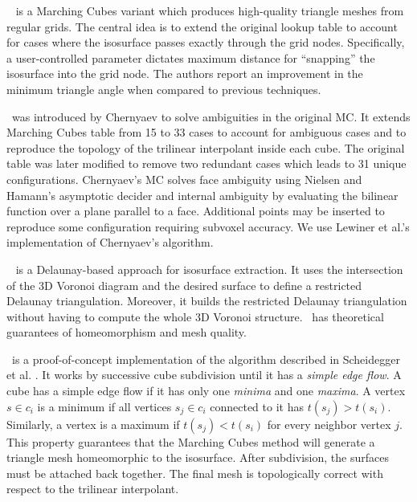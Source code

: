 \snapmc\ \cite{Raman:2008:QIM} is a Marching Cubes variant which produces high-quality 
triangle meshes from regular grids. The central idea is to extend the 
original lookup table to account for cases where the isosurface passes exactly through the 
grid nodes. Specifically, a user-controlled parameter dictates maximum distance 
for ``snapping'' the isosurface into the grid node. 
The authors report an improvement in the minimum triangle angle when compared to previous techniques.


\mclewiner\ was introduced by Chernyaev
\cite{Chernyaev95marchingcubes} to solve ambiguities in the original MC. It
extends Marching Cubes table from 15 to 33 cases to account for ambiguous cases
and to reproduce the topology of the trilinear interpolant inside each cube. The
original table was later modified to remove two redundant cases which leads to 31
unique configurations. Chernyaev's MC solves face ambiguity using Nielsen and
Hamann's \cite{Nielson:1991:ADR:949607.949621} asymptotic decider and internal ambiguity
by evaluating the bilinear function over a plane parallel to a face. Additional
points may be inserted to reproduce some configuration requiring subvoxel
accuracy.  We use Lewiner et al.'s implementation \cite{Lewiner:2003} of
Chernyaev's algorithm.

\deliso\ \cite{Dey07} is a Delaunay-based approach for isosurface extraction. 
It uses the intersection of the 3D Voronoi diagram and the desired surface to 
define a restricted Delaunay triangulation. Moreover, it
builds the restricted Delaunay triangulation without having to
compute the whole 3D Voronoi structure. \deliso\ has theoretical guarantees of
homeomorphism and mesh quality.

\mcsimpleflow\ is a proof-of-concept implementation of the algorithm
described in Scheidegger et al.
\cite{scheidegger:techreport:2010}. It works by successive cube
subdivision until it has a \emph{simple edge flow}. A cube has a
simple edge flow if it has only one \emph{minima} and one
\emph{maxima}. A vertex $s \in c_i$ is a minimum if all vertices $s_j
\in c_i$ connected to it has $t(s_j) > t(s_i)$. Similarly, a vertex is
a maximum if $t(s_j) < t(s_i)$ for every neighbor vertex $j$.  This
property guarantees that the Marching Cubes method will generate a
triangle mesh homeomorphic to the isosurface. After subdivision, the
surfaces must be attached back together. The final mesh is
topologically correct with respect to the trilinear interpolant.

